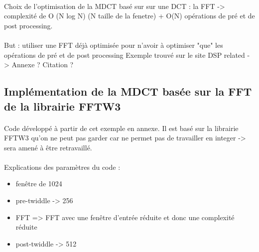 \documentclass{article}
\begin{document}

    \paragraph{}
    Choix de l'optimisation de la MDCT basé sur sur une DCT : la FFT -> complexité de O (N log N) (N taille de la fenetre) + O(N) opérations de pré et de post processing.

    \paragraph{}
    But : utiliser une FFT déjà optimisée pour n'avoir à optimiser "que" les opérations de pré et de post processing
    Exemple trouvé sur le site DSP related -> Annexe ? Citation ?

    \subsection{Implémentation de la MDCT basée sur la FFT de la librairie FFTW3}
    \paragraph{}
    Code développé à partir de cet exemple en annexe. Il est basé sur la librairie FFTW3 qu'on ne peut pas garder car ne permet pas de travailler en integer -> sera amené à être retravaillé.

    \paragraph{}
    Explications des paramètres du code :
    \begin{itemize}
        \item fenêtre de 1024
        \item pre-twiddle -> 256
        \item FFT => FFT avec une fenêtre d'entrée réduite et donc une complexité réduite
        \item post-twiddle -> 512
    \end{itemize}
\end{document}
